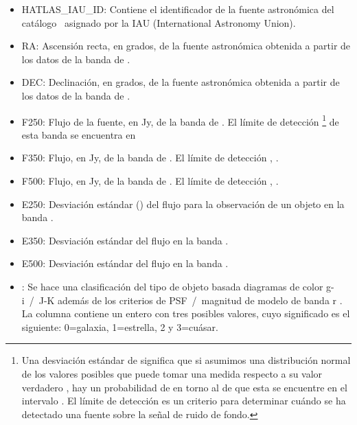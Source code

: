 \vspace{-3mm}
\begin{itemize}
    \setlength\itemsep{-1mm}
    \item HATLAS\_IAU\_ID: Contiene el identificador de la fuente astronómica del catálogo \hatlas\ asignado por la IAU (International Astronomy Union).
    \item RA: Ascensión recta, en grados, de la fuente astronómica obtenida a partir de los datos de la banda de .
    \item DEC: Declinación, en grados, de la fuente astronómica obtenida a partir de los datos de la banda de . 
    
    \item F250: Flujo de la fuente, en Jy, de la banda de .  El límite de detección \maths{5\sigma}\footnote{Una desviación estándar de \maths{1\sigma} significa que si asumimos una distribución normal de los valores posibles que puede tomar una medida respecto a su valor verdadero , hay un probabilidad de en torno al  de que esta se encuentre en el intervalo . El límite de detección \maths{5\sigma} es un criterio para determinar cuándo se ha detectado una fuente sobre la señal de ruido de fondo.} de esta banda se encuentra en  \citep{article:Nuevo_2012}
    
    \item F350: Flujo, en Jy, de la banda de . El límite de detección \maths{5\sigma}, .
    
    \item F500: Flujo, en Jy, de la banda de . El límite de detección \maths{5\sigma}, .
    
    \item E250: Desviación estándar (\maths{1\sigma}) del flujo para la observación de un objeto en la banda . 
    \item E350: Desviación estándar del flujo en la banda .
    \item E500: Desviación estándar del flujo en la banda .
    \item {}: Se hace una clasificación del tipo de objeto basada diagramas de color g-i~/~J-K además de los criterios de PSF~/~magnitud de modelo de banda r \citep{article:bourne_2016}. La columna contiene un entero con tres posibles valores, cuyo significado es el  siguiente: 0=galaxia, 1=estrella, 2 y 3=cuásar.
    

\end{itemize}
